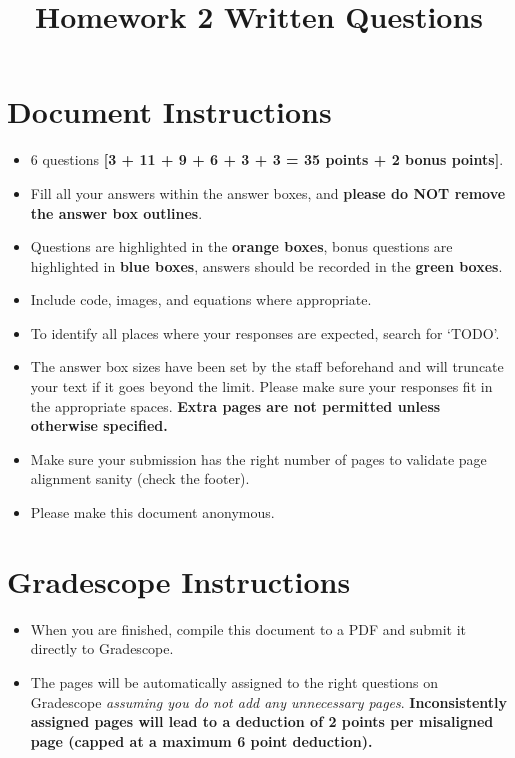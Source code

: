 \documentclass[11pt]{article}
\date{}
\title{\vspace{-1cm}Homework 2 Written Questions}
\begin{document}
\maketitle
\vspace{-3cm}
\thispagestyle{fancy}


\section*{ Document Instructions}
\begin{itemize}
  \item 6 questions \textbf{[3 + 11 + 9 + 6 + 3 + 3 = 35 points + 2 bonus points]}.
  \item Fill all your answers within the answer boxes, and \textbf{please do NOT remove the answer box outlines}.
  \item Questions are highlighted in the \textbf{orange boxes}, bonus questions are highlighted in \textbf{blue boxes}, answers should be recorded in the \textbf{green boxes}.
  \item Include code, images, and equations where appropriate.
  \item To identify all places where your responses are expected, search for `TODO'.
  \item The answer box sizes have been set by the staff beforehand and will truncate your text if it goes beyond the limit. Please make sure your responses fit in the appropriate spaces. \textbf{Extra pages are not permitted unless otherwise specified.}
  \item Make sure your submission has the right number of pages to validate page alignment sanity (check the footer).
  \item Please make this document anonymous.
\end{itemize}

\section*{ Gradescope Instructions}
\begin{itemize}
  \item When you are finished, compile this document to a PDF and submit it directly to Gradescope. 
  \item The pages will be automatically assigned to the right questions on Gradescope \textit{assuming you do not add any unnecessary pages}. \textbf{Inconsistently assigned pages will lead to a deduction of 2 points per misaligned page (capped at a maximum 6 point deduction).}
\end{itemize}
\pagebreak
\end{document}
